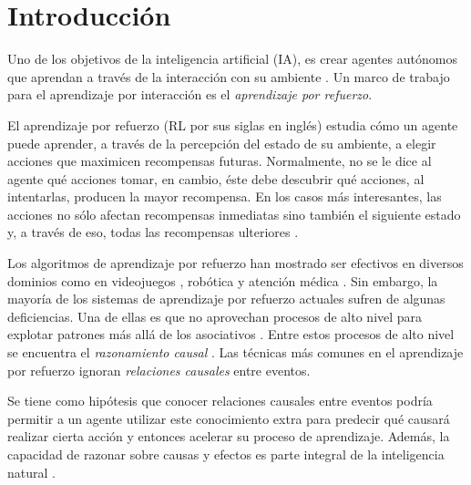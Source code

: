 \chapter{Introducción}\label{chapter1}



\graphicspath{{Chapter1/Figs/}}

Uno de los objetivos de la inteligencia artificial (IA), es crear agentes autónomos que aprendan
a través de la interacción con su ambiente \cite{surveyDRL2017}.
Un marco de trabajo para el aprendizaje por interacción es el \textit{aprendizaje por
refuerzo}.


El aprendizaje por refuerzo (RL por sus siglas en inglés) estudia cómo un agente puede aprender, a través de la percepción del estado de su ambiente,
a elegir acciones que maximicen recompensas futuras. 
Normalmente, no se le dice al agente qué acciones
tomar, en cambio, éste debe descubrir qué acciones, al intentarlas, producen la mayor recompensa.
En los casos más interesantes, las acciones no sólo afectan recompensas inmediatas
sino también el siguiente estado y, a través de eso, todas las recompensas ulteriores \cite{sutton_barto_2018}.

Los algoritmos de aprendizaje por refuerzo 
han mostrado ser efectivos en diversos dominios como en videojuegos \cite{mnih2013playing, vinyals2019grandmaster}, 
robótica \cite{openai2019solving}
y atención médica \cite{gottesman2018evaluating}.
Sin embargo, la mayoría de los  sistemas de aprendizaje por refuerzo actuales sufren de algunas deficiencias. Una de ellas es que no aprovechan procesos de
alto nivel para 
explotar patrones más allá de los asociativos \cite{garnelo2016deep, playingagainstnature2018}. Entre estos procesos de alto nivel se encuentra el \textit{razonamiento causal} \cite{pearl_2009, spirtes2000causation}. Las técnicas más comunes
en el aprendizaje por refuerzo ignoran \textit{relaciones causales} entre eventos.

Se tiene como hipótesis que conocer relaciones causales entre eventos podría permitir a un agente 
utilizar este conocimiento extra
para predecir qué causará realizar cierta acción
y entonces acelerar su proceso de aprendizaje.
Además, la capacidad de razonar sobre causas y efectos es parte integral de
la inteligencia natural \cite{nair2019causal}.


